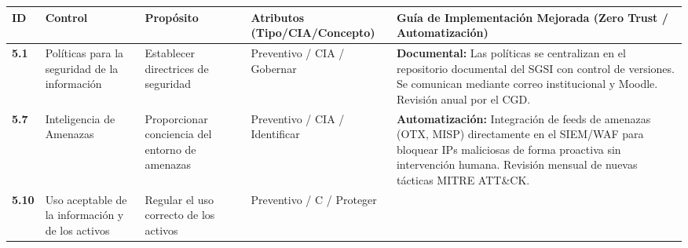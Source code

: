 \documentclass[10pt,letterpaper]{article}
\begin{document}
{\setlength{\RaggedRightRightskip}{0pt plus 5em}\small\sloppy \begin{longtable}[]{@{}
  >{\hspace{0pt}\RaggedRight\arraybackslash}p{}
  >{\hspace{0pt}\RaggedRight\arraybackslash}p{}
  >{\hspace{0pt}\RaggedRight\arraybackslash}p{}
  >{\hspace{0pt}\RaggedRight\arraybackslash}p{}
  >{\hspace{0pt}\RaggedRight\arraybackslash}p{}@{}}
\toprule\noalign{}
\begin{minipage}[b]{\linewidth}\raggedright
ID
\end{minipage} & \begin{minipage}[b]{\linewidth}\raggedright
Control
\end{minipage} & \begin{minipage}[b]{\linewidth}\raggedright
Propósito
\end{minipage} & \begin{minipage}[b]{\linewidth}\raggedright
Atributos (Tipo/CIA/Concepto)
\end{minipage} & \begin{minipage}[b]{\linewidth}\raggedright
Guía de Implementación Mejorada (Zero Trust / Automatización)
\end{minipage} \\
\midrule\noalign{}
\endhead
\bottomrule\noalign{}
\endlastfoot
\textbf{5.1} & Políticas para la seguridad de la información &
Establecer directrices de seguridad & Preventivo / CIA / Gobernar &
\textbf{Documental:} Las políticas se centralizan en el repositorio
documental del SGSI con control de versiones. Se comunican mediante
correo institucional y Moodle. Revisión anual por el CGD. \\
\textbf{5.7} & Inteligencia de Amenazas & Proporcionar conciencia del
entorno de amenazas & Preventivo / CIA / Identificar &
\textbf{Automatización:} Integración de feeds de amenazas (OTX, MISP)
directamente en el SIEM/WAF para bloquear IPs maliciosas de forma
proactiva sin intervención humana. Revisión mensual de nuevas tácticas
MITRE ATT\&CK. \\
\textbf{5.10} & Uso aceptable de la información y de los activos &
Regular el uso correcto de los activos & Preventivo / C / Proteger &

\end{longtable}}
\end{document}
